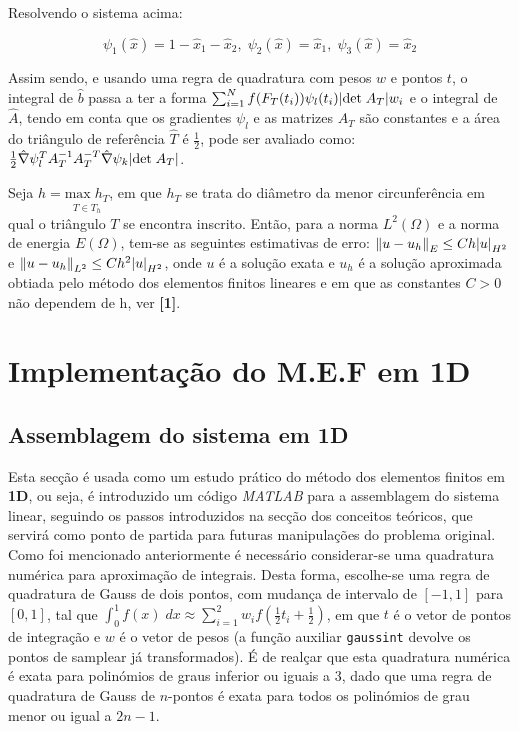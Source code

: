 \documentclass{article}
\theoremstyle{definition}
\theoremstyle{plain}
\numberwithin{equation}{section}
\newcommand{\tab}{\hspace{10mm}}
\begin{document}
Resolvendo o sistema acima:

\begin{equation*}
    \psi_1(\hat{x})=1-\hat{x}_1-\hat{x}_2, \; \psi_2(\hat{x})=\hat{x}_1, \; \psi_3(\hat{x})=\hat{x}_2
\end{equation*}

Assim sendo, e usando uma regra de quadratura com pesos $w$ e pontos $t$, o integral de $\hat{b}$ passa a ter a forma $\sum^N_{i=1}f(F_T(t_i))\psi_l(t_i)\abs{\textrm{det} \; A_T}w_i$ e o integral de $\hat{A}$, tendo em conta que os gradientes $\psi_l$ e as matrizes $A_T$ são constantes e a área do triângulo de referência $\hat{T}$ é $\frac{1}{2}$, pode ser avaliado como: $\frac{1}{2}\hat{\nabla}\psi^T_lA^{-1}_TA^{-T}_T\hat{\nabla}\psi_k\abs{\textrm{det} \; A_T}$.

\tab Seja $h=\underset{T \in T_h}{\textrm{max} \; h_T}$, em que $h_T$ se trata do diâmetro da menor circunferência em qual o triângulo $T$ se encontra inscrito. Então, para a norma $L^2(\Omega)$ e a norma de energia $E(\Omega)$, tem-se as seguintes estimativas de erro: $\norm{u-u_h}_E \leq Ch \abs{u}_{H^2}$ e $\norm{u-u_h}_{L^2} \leq Ch^2 \abs{u}_{H^2}$, onde $u$ é a solução exata e $u_h$ é a solução aproximada obtiada pelo método dos elementos finitos lineares e em que as constantes $C>0$  não dependem de h, ver \textbf{[1]}.

\vspace{1mm}
\section{Implementação do M.E.F em 1D}
\subsection{Assemblagem do sistema em 1D}
\tab Esta secção é usada como um estudo prático do método dos elementos finitos em \textbf{1D}, ou seja, é introduzido um código \emph{MATLAB} para a assemblagem do sistema linear, seguindo os passos introduzidos na secção dos conceitos teóricos, que servirá como ponto de partida para futuras manipulações do problema original. Como foi mencionado anteriormente é necessário considerar-se uma quadratura numérica para aproximação de integrais. Desta forma, escolhe-se uma regra de quadratura de Gauss de dois pontos, com mudança de intervalo de $[-1,1]$ para $[0,1]$, tal que $\int_0^1 f(x) \; dx \approx \sum^2_{i=1} w_i f\left(\frac{1}{2}t_i+\frac{1}{2}\right)$, em que $t$ é o vetor de pontos de integração e $w$ é o vetor de pesos (a função auxiliar \verb+gaussint+ devolve os pontos de samplear já transformados). É de realçar que esta quadratura numérica é exata para polinómios de graus inferior ou iguais a $3$, dado que uma regra de quadratura de Gauss de $n$-pontos é exata para todos os polinómios de grau menor ou igual a $2n-1$.
\end{document}
